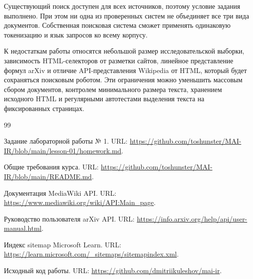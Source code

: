 \documentclass[pdf,unicode,12pt,a4paper,oneside,fleqn]{article}
\begin{document}
Существующий поиск доступен для всех источников, поэтому условие задания
выполнено. При этом ни одна из проверенных систем не объединяет все три вида
документов. Собственная поисковая система сможет применять одинаковую
токенизацию и язык запросов ко всему корпусу.

К недостаткам работы относятся небольшой размер исследовательской выборки,
зависимость HTML-селекторов от разметки сайтов, линейное представление формул
arXiv и отличие API-представления Wikipedia от HTML, который будет сохраняться
поисковым роботом. Эти ограничения можно уменьшить массовым сбором документов,
контролем минимального размера текста, хранением исходного HTML и регулярными
автотестами выделения текста на фиксированных страницах.

\renewcommand{\refname}{Использованные источники}

\begin{thebibliography}{99}

Задание лабораторной работы № 1. URL:
\url{https://github.com/toshunster/MAI-IR/blob/main/lesson-01/homework.md}.

Общие требования курса. URL:
\url{https://github.com/toshunster/MAI-IR/blob/main/README.md}.

Документация MediaWiki API. URL:
\url{https://www.mediawiki.org/wiki/API:Main_page}.

Руководство пользователя arXiv API. URL:
\url{https://info.arxiv.org/help/api/user-manual.html}.

Индекс sitemap Microsoft Learn. URL:
\url{https://learn.microsoft.com/_sitemaps/sitemapindex.xml}.

Исходный код работы. URL:
\url{https://github.com/dmitriikuleshov/mai-ir}.

\end{thebibliography}
\end{document}
